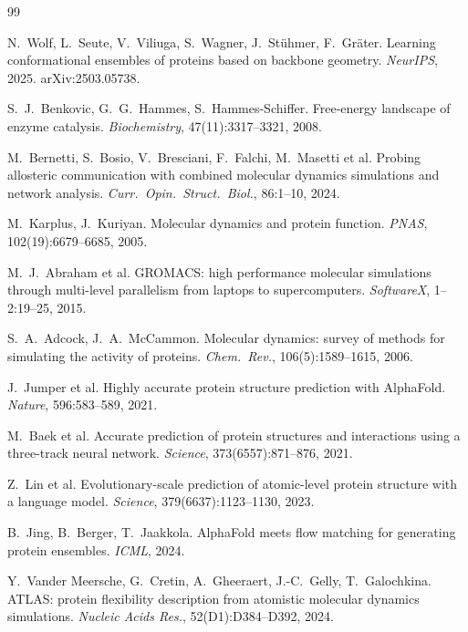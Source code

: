 \documentclass[12pt]{article}
\begin{document}
\renewcommand{\refname}{\large References}
\begin{thebibliography}{99}\setlength{\itemsep}{2pt}\small

 N.~Wolf, L.~Seute, V.~Viliuga, S.~Wagner, J.~St\"uhmer, F.~Gr\"ater. Learning conformational ensembles of proteins based on backbone geometry. \emph{NeurIPS}, 2025. arXiv:2503.05738.

 S.~J.~Benkovic, G.~G.~Hammes, S.~Hammes-Schiffer. Free-energy landscape of enzyme catalysis. \emph{Biochemistry}, 47(11):3317--3321, 2008.

 M.~Bernetti, S.~Bosio, V.~Bresciani, F.~Falchi, M.~Masetti et al. Probing allosteric communication with combined molecular dynamics simulations and network analysis. \emph{Curr.\ Opin.\ Struct.\ Biol.}, 86:1--10, 2024.

 M.~Karplus, J.~Kuriyan. Molecular dynamics and protein function. \emph{PNAS}, 102(19):6679--6685, 2005.

 M.~J.~Abraham et al. GROMACS: high performance molecular simulations through multi-level parallelism from laptops to supercomputers. \emph{SoftwareX}, 1--2:19--25, 2015.

 S.~A.~Adcock, J.~A.~McCammon. Molecular dynamics: survey of methods for simulating the activity of proteins. \emph{Chem.\ Rev.}, 106(5):1589--1615, 2006.

 J.~Jumper et al. Highly accurate protein structure prediction with AlphaFold. \emph{Nature}, 596:583--589, 2021.

 M.~Baek et al. Accurate prediction of protein structures and interactions using a three-track neural network. \emph{Science}, 373(6557):871--876, 2021.

 Z.~Lin et al. Evolutionary-scale prediction of atomic-level protein structure with a language model. \emph{Science}, 379(6637):1123--1130, 2023.

 B.~Jing, B.~Berger, T.~Jaakkola. AlphaFold meets flow matching for generating protein ensembles. \emph{ICML}, 2024.

 Y.~Vander Meersche, G.~Cretin, A.~Gheeraert, J.-C.~Gelly, T.~Galochkina. ATLAS: protein flexibility description from atomistic molecular dynamics simulations. \emph{Nucleic Acids Res.}, 52(D1):D384--D392, 2024.


\end{thebibliography}
\end{document}

